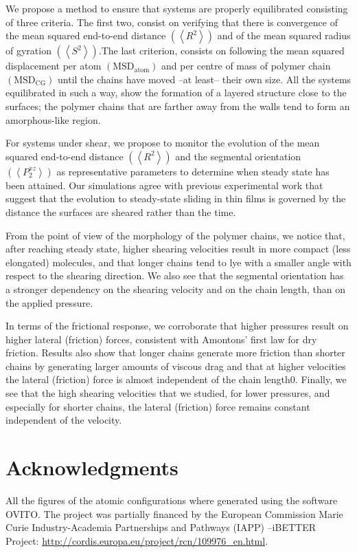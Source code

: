 \documentclass[aps,prb,reprint,superscriptaddress, a4paper]{revtex4-1}
\begin{document}
We propose a method to ensure that systems are properly equilibrated consisting of three criteria. The first two, consist on verifying that there is convergence of the mean squared end-to-end distance $\left(\left< R^2 \right> \right)$ and of  the mean squared radius of gyration $\left(\left< S^2 \right> \right)$.The last criterion, consists on following the mean squared displacement per atom $\left(\text{MSD}_{\text{atom}}\right)$ and per centre of mass of polymer chain $\left(\text{MSD}_{\text{CG}}\right)$ until the chains have moved --at least-- their own size\cite{Auhl2003}. All the systems equilibrated in such a way, show the formation of a  layered structure close to the surfaces; the polymer chains that are farther away  from the walls tend to form an amorphous-like region. 

For systems under shear, we propose to monitor the evolution of the mean squared end-to-end distance $\left(\left< R^2 \right> \right)$ and the segmental orientation $\left(\left<P_{2}^{xz} \right> \right)$ as representative parameters to determine when steady state has been attained. Our simulations  agree with previous experimental work that suggest\cite{Drummond2000} that the  evolution to steady-state sliding in thin films is governed by the distance the surfaces are sheared rather than the time.

From the point of view of the morphology of the polymer chains, we notice that, after reaching steady state, higher shearing velocities result in more compact (less elongated) molecules, and that longer chains tend to  lye  with a smaller angle with respect to the shearing direction.  We also see that the segmental orientation has a stronger dependency on the shearing velocity and on the chain length, than on the applied pressure.

In terms of the frictional response, we corroborate that higher pressures result on higher lateral (friction) forces, consistent with Amontons' first law for dry friction. Results also show that  longer chains generate more friction than shorter chains by  generating larger amounts of viscous drag and that at higher velocities the  lateral (friction) force is almost independent of the chain length0. Finally, we see that the high shearing velocities that we studied, for lower pressures, and especially for shorter chains, the lateral (friction) force remains constant independent of the velocity.


\section*{Acknowledgments}

All the figures of the atomic configurations where generated using the software OVITO\cite{Stukowski2010b}. The project was partially financed by the European Commission Marie Curie Industry-Academia Partnerships and Pathways (IAPP) –iBETTER Project: \url{http://cordis.europa.eu/project/rcn/109976_en.html}.


\end{document}
